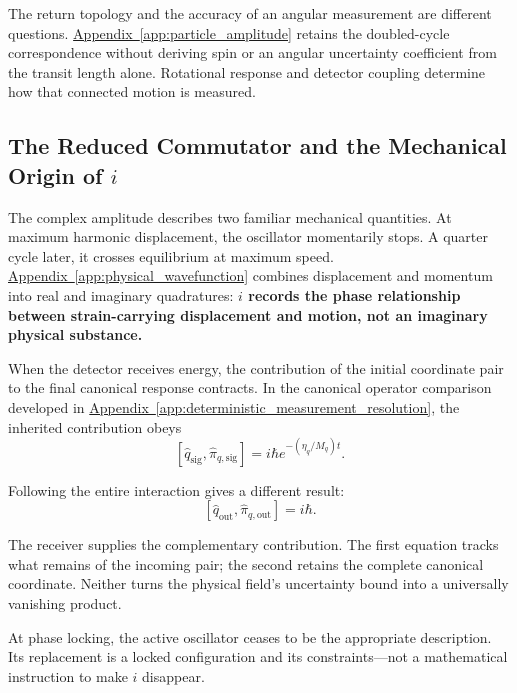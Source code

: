 The return topology and the accuracy of an angular measurement are different questions. \hyperref[app:particle_amplitude]{Appendix~\ref*{app:particle_amplitude}} retains the doubled-cycle correspondence without deriving spin or an angular uncertainty coefficient from the transit length alone. Rotational response and detector coupling determine how that connected motion is measured.


\subsection{The Reduced Commutator and the Mechanical Origin of $i$}
\label{sec:imaginary_operator}

The complex amplitude describes two familiar mechanical quantities. At maximum harmonic displacement, the oscillator momentarily stops. A quarter cycle later, it crosses equilibrium at maximum speed. \hyperref[app:physical_wavefunction]{Appendix~\ref*{app:physical_wavefunction}} combines displacement and momentum into real and imaginary quadratures: \textbf{$i$ records the phase relationship between strain-carrying displacement and motion, not an imaginary physical substance.}

When the detector receives energy, the contribution of the initial coordinate pair to the final canonical response contracts. In the canonical operator comparison developed in \hyperref[app:deterministic_measurement_resolution]{Appendix~\ref*{app:deterministic_measurement_resolution}}, the inherited contribution obeys
\begin{equation}
    \left[
        \widehat q_{\mathrm{sig}},
        \widehat{\pi}_{q,\mathrm{sig}}
    \right]
    =
    i\hbar e^{-(\eta_q/M_q)t}.
\end{equation}

Following the entire interaction gives a different result:
\begin{equation}
    \left[
        \widehat q_{\mathrm{out}},
        \widehat{\pi}_{q,\mathrm{out}}
    \right]
    =
    i\hbar.
\end{equation}

The receiver supplies the complementary contribution. The first equation tracks what remains of the incoming pair; the second retains the complete canonical coordinate. Neither turns the physical field's uncertainty bound into a universally vanishing product.

At phase locking, the active oscillator ceases to be the appropriate description. Its replacement is a locked configuration and its constraints---not a mathematical instruction to make $i$ disappear.


